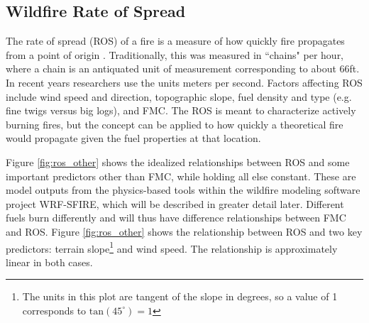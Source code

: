 \documentclass[11pt]{article}%
\begin{document}
\subsection{Wildfire Rate of Spread}

The rate of spread (ROS) of a fire is a measure of how quickly fire propagates from a point of origin \citep[e.g.,][]{NFSC-2024-MFB}. Traditionally, this was measured in ``chains" per hour, where a chain is an antiquated unit of measurement corresponding to about 66ft. In recent years researchers use the units meters per second. Factors affecting ROS include wind speed and direction, topographic slope, fuel density and type (e.g. fine twigs versus big logs), and FMC. The ROS is meant to characterize actively burning fires, but the concept can be applied to how quickly a theoretical fire would propagate given the fuel properties at that location. 

Figure \ref{fig:ros_other} shows the idealized relationships between ROS and some important predictors other than FMC, while holding all else constant. These are model outputs from the physics-based tools within the wildfire modeling software project WRF-SFIRE, which will be described in greater detail later. Different fuels burn differently and will thus have difference relationships between FMC and ROS. Figure \ref{fig:ros_other} shows the relationship between ROS and two key predictors: terrain slope\footnote{The units in this plot are tangent of the slope in degrees, so a value of 1 corresponds to $\text{tan} (45^\circ) = 1$} and wind speed. \cite{OpenWFM-2024-HTD} The relationship is approximately linear in both cases.
\end{document}
